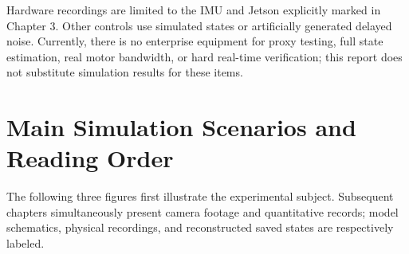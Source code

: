 Hardware recordings are limited to the IMU and Jetson explicitly marked in Chapter 3. Other controls use simulated states or artificially generated delayed noise. Currently, there is no enterprise equipment for proxy testing, full state estimation, real motor bandwidth, or hard real-time verification; this report does not substitute simulation results for these items.


\section{Main Simulation Scenarios and Reading Order}
The following three figures first illustrate the experimental subject. Subsequent chapters simultaneously present camera footage and quantitative records; model schematics, physical recordings, and reconstructed saved states are respectively labeled.




